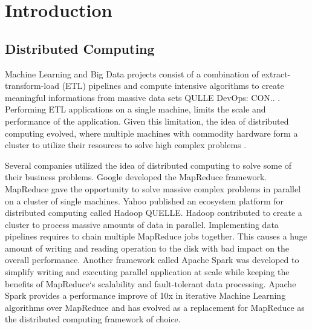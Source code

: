 \chapter{Introduction}
\label{sec:introduction}

\section{Distributed Computing}
Machine Learning and Big Data projects consist of a combination of extract-transform-load (ETL) pipelines and compute intensive algorithms to create meaningful informations from massive data sets QULLE DevOps: CON.. .
Performing ETL applications on a single machine, limits the scale and performance of the application. Given this limitation, the idea of distributed computing evolved, where multiple machines with commodity hardware form a cluster to utilize their resources to solve high complex problems \cite{Ganelin2016Spark}.

Several companies utilized the idea of distributed computing to solve some of their business problems. 
Google developed the MapReduce \cite{Dean2004MapReduce} framework. MapReduce gave the opportunity to solve massive complex problems in parallel on a cluster of single machines.
Yahoo published an ecosystem platform for distributed computing called Hadoop QUELLE. Hadoop contributed to create a cluster to process massive amounts of data in parallel.
Implementing data pipelines requires to chain multiple MapReduce jobs together. This causes a huge amount of writing and reading operation to the disk with bad impact on the overall performance. Another framework called Apache Spark was developed to simplify writing and executing parallel application at scale while keeping the benefits of MapReduce`s scalability and fault-tolerant data processing. Apache Spark provides a performance improve of 10x in iterative Machine Learning algorithms over MapReduce \cite{Zaharia2010Spark} and has evolved as a replacement for MapReduce as the distributed computing framework of choice.


